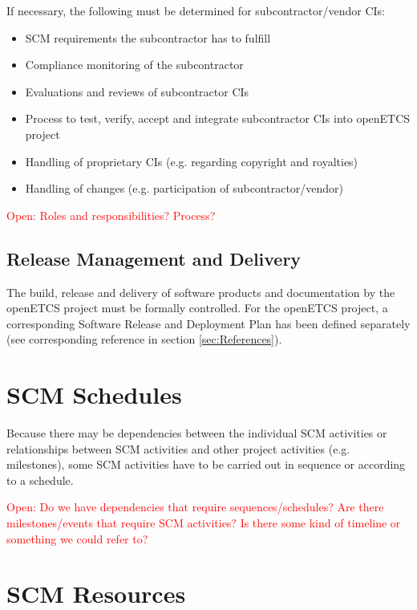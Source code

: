 \documentclass{template/openetcs_article}
\begin{document}
If necessary, the following must be determined for subcontractor/vendor CIs:

\vspace{-10pt}
\begin{itemize}
\item SCM requirements the subcontractor has to fulfill
\item Compliance monitoring of the subcontractor
\item Evaluations and reviews of subcontractor CIs
\item Process to test, verify, accept and integrate subcontractor CIs into openETCS project
\item Handling of proprietary CIs (e.g. regarding copyright and royalties)
\item Handling of changes (e.g. participation of subcontractor/vendor)
\end{itemize}

\textcolor{red}{Open: Roles and responsibilities? Process?}


\subsection{Release Management and Delivery} %
\label{sec:Release Management and Delivery}

The build, release and delivery of software products and documentation by the openETCS project must be formally controlled. For the openETCS project, a corresponding Software Release and Deployment Plan has been defined separately (see corresponding reference in section \ref{sec:References}).

\newpage


\section{SCM Schedules} %
\label{sec:SCM Schedules}

Because there may be dependencies between the individual SCM activities or relationships between SCM activities and other project activities (e.g. milestones), some SCM activities  have to be carried out in sequence or according to a schedule.

\textcolor{red}{Open: Do we have dependencies that require sequences/schedules? Are there milestones/events that require SCM activities? Is there some kind of timeline or something we could refer to?}

\newpage


\section{SCM Resources} %
\label{sec:SCM Resources}
\end{document}
